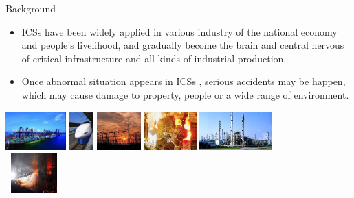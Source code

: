 \documentclass[10pt, compress]{beamer}
\begin{document}
\begin{frame}{Background}
    \begin{itemize}
      \item ICSs have been widely applied in various industry of the national economy and people's livelihood, and gradually become the brain and central nervous of critical infrastructure and all kinds of industrial production.
      \item Once abnormal situation appears in ICSs , serious accidents may be happen, which may cause damage to property, people or a wide range of environment.
    \end{itemize}
    
    \begin{center}
      \begin{minipage}[m]{0.9\textwidth}
        \includegraphics[height=1.5cm]{Figures/Introduction/Fig1.png} \hfill
        \includegraphics[height=1.5cm]{Figures/Introduction/Fig2.png} \hfill
        \includegraphics[height=1.5cm]{Figures/Introduction/Fig3.png} \hfill
        \includegraphics[height=1.5cm]{Figures/Introduction/Fig4.png} \hfill
        \includegraphics[height=1.5cm]{Figures/Introduction/Fig5.png} \vspace{1pt}\\        
        \includegraphics[height=1.5cm, width = 2.2cm]{Figures/Introduction/Fig6.png} \hfill

\end{minipage}
\end{center}
\end{frame}
\end{document}
